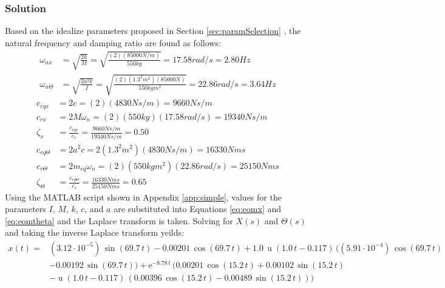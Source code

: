 \documentclass[12pt]{article}
\begin{document}
\subsubsection{Solution}
Based on the idealize parameters proposed in Section \ref{sec:paramSelection} , the natural frequency and damping ratio are found as follows: 
\begin{equation}
	\begin{split}
	\omega _{nx} &= \sqrt{\frac{2k}{M}} = \sqrt{\frac{(2)(85000N/m)}{550kg}} = 17.58rad/s = 2.80Hz \\
	\omega _{n\Theta} &= \sqrt{\frac{2a^2k}{I}} = \sqrt{\frac{(2)(1.3^2m^2)(85000N)}{550kgm^2}} = 22.86rad/s = 3.64Hz 
	\end{split}  
\end{equation}
\begin{equation}
	\begin{split}
		c_{eqx} &= 2c = (2)(4830Ns/m) = 9660Ns/m \\ 
		c_{rx} &= 2M\omega _n = (2)(550kg)(17.58rad/s) = 19340Ns/m \\ 
		\zeta _x& = \frac{c_{eqx}}{c_r} = \frac{9660Ns/m}{19340Ns/m} = 0.50\\
		c_{eq\Theta} &= 2a^2c =  2(1.3^2m^2)(4830Ns/m) = 16330Nms\\
		c_{r\Theta} &= 2m_{eq}\omega _n = (2)(550kgm^2)(22.86rad/s) = 25150Nms\\ 
		\zeta _\Theta &= \frac{c_{eq\Theta}}{c_r} = \frac{16330Nms}{ 25150Nms} = 0.65
	\end{split}  
\end{equation}
Using the MATLAB script shown in Appendix \ref{app:simple}, values for the parameters $I$, $M$, $k$, $c$, and $a$ are substituted into Equations \ref{eq:eomx} and \ref{eq:eomtheta} and the Laplace transform is taken. Solving for $X(s)$ and $\Theta(s)$ and taking the inverse Laplace transform yeilds:
\begin{equation}
		\begin{split}
		x(t) = &(3.12\cdot 10^{-5})\, \sin\!(69.7\, t) - 0.00201\, \cos\!(69.7\, t) + 1.0\, \mathop{\mathrm{u}}\nolimits\!(1.0\, t - 0.117)\, ((5.91\cdot 10^{-4})\, \cos\!(69.7\, t) \\
		&- 0.00192\, \sin\!(69.7\, t)) + \mathrm{e}^{- 8.78\, t}\, (0.00201\, \cos\!(15.2\, t) + 0.00102\, \sin\!(15.2\, t) \\
		&- \mathop{\mathrm{u}}\nolimits\!(1.0\, t - 0.117)\, (0.00396\, \cos\!(15.2\, t) - 0.00489\, \sin\!(15.2\, t)))
		\end{split}
\end{equation} 
\end{document}
